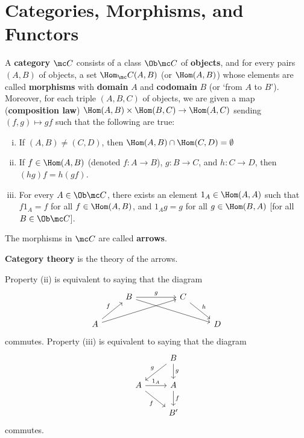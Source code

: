 
\section{Categories, Morphisms, and Functors}

\begin{defn}
    A \textbf{category} $\mc C$ consists of a class $\Ob \mc C$ of \textbf{objects}, and for every pairs $(A,B)$ of objects, a set $\Hom _\mc C(A,B)$ (or $\Hom(A,B)$) whose elements are called \textbf{morphisms} with \textbf{domain} $A$ and \textbf{codomain} $B$ (or `from $A$ to $B$'). Moreover, for each triple $(A,B,C)$ of objects, we are given a map (\textbf{composition law}) $\Hom(A,B) \times \Hom(B,C) \to \Hom(A,C)$ sending $(f,g) \mapsto gf$ such that the following are true:
    \begin{enumerate}[(i)]
        \item If $(A,B) \neq (C,D)$, then $\Hom(A,B) \cap \Hom(C,D) = \emptyset$
        \item If $f \in \Hom(A,B)$ (denoted $f:A \to B$), $g:B \to C$, and $h:C \to D$, then $(hg)f=h(gf)$.
        \item For every $A \in \Ob \mc C$, there exists an element $1_A \in \Hom(A,A)$ such that $f1_A=f$ for all $f \in \Hom(A,B)$, and $1_Ag = g$ for all $g \in \Hom(B,A)$ [for all $B \in \Ob \mc C$].
    \end{enumerate}
    The morphisms in $\mc C$ are called \textbf{arrows}.

    \textbf{Category theory} is the theory of the arrows.
\end{defn}

\begin{rmk}
    Property (ii) is equivalent to saying that the diagram
    \[\begin{tikzcd}[ampersand replacement=\&]
    	\& B \&\& C \& \\
    	A \&\&\&\& D
    	\arrow["g", from=1-2, to=1-4]
    	\arrow[from=1-2, to=2-5]
    	\arrow["h", from=1-4, to=2-5]
    	\arrow["f", from=2-1, to=1-2]
    	\arrow[from=2-1, to=1-4]
    \end{tikzcd}\]
    commutes. Property (iii) is equivalent to saying that the diagram
    \[\begin{tikzcd}[ampersand replacement=\&]
    	\& B \\
    	A \& A \\
    	\& {B'}
    	\arrow["g"', from=1-2, to=2-1]
    	\arrow["g", from=1-2, to=2-2]
    	\arrow["{1_A}", from=2-1, to=2-2]
    	\arrow["f"', from=2-1, to=3-2]
    	\arrow["f", from=2-2, to=3-2]
    \end{tikzcd}\]
    commutes.
\end{rmk}


